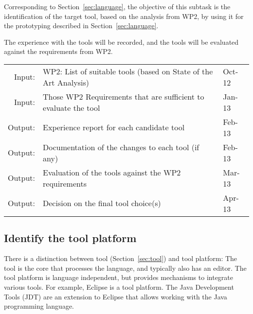 \documentclass[11pt, a4paper]{article}
\let\oldmarginpar\marginpar
\renewcommand\marginpar[1]{\-\oldmarginpar[\raggedleft\scriptsize #1]%
{\raggedright\scriptsize #1}}
\newenvironment{inoutput}
{\vspace{2mm}
\noindent
\begin{tabular}{|r|p{.7\linewidth}|l|}
\hline}
{
\hline
\end{tabular}}
\begin{document}
Corresponding to Section~\ref{sec:language}, the objective of this subtask is the identification of the target tool, based on the analysis from WP2, by using it for the prototyping described in Section~\ref{sec:language}.

The experience with the tools will be recorded, and the tools will be evaluated against the requirements from WP2.

\begin{inoutput}
Input: & WP2: List of suitable tools (based on State of the Art Analysis) & Oct-12 \\
Input: & Those WP2 Requirements that are sufficient to evaluate the tool & Jan-13 \\
\hline
Output: & Experience report for each candidate tool & Feb-13 \\
Output: & Documentation of the changes to each tool (if any) & Feb-13 \\
Output: & Evaluation of the tools against the WP2 requirements & Mar-13 \\
Output: & Decision on the final tool choice(s) & Apr-13 \\
\end{inoutput}

\subsection{Identify the tool platform}
\label{sec:tool_platform}

There is a distinction between tool (Section~\ref{sec:tool}) and tool platform: The tool is the core that processes the language, and typically also has an editor.  The tool platform is language independent, but provides mechanisms to integrate various tools.  For example, Eclipse is a tool platform.  The Java Development Tools (JDT) are an extension to Eclipse that allows working with the Java programming language.
\end{document}
